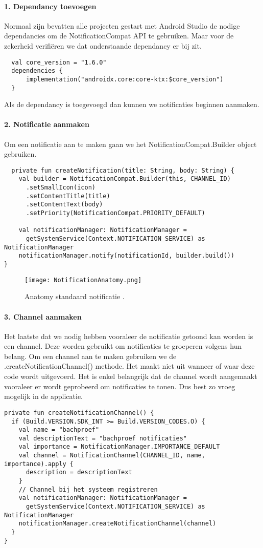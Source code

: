 \paragraph{1. Dependancy toevoegen}
Normaal zijn bevatten alle projecten gestart met Android Studio de nodige dependancies om de NotificationCompat API
te gebruiken. Maar voor de zekerheid verifiëren we dat onderstaande dependancy er bij zit.
\begin{verbatim}
  val core_version = "1.6.0"
  dependencies {
      implementation("androidx.core:core-ktx:$core_version")
  }
\end{verbatim}
Als de dependancy is toegevoegd dan kunnen we notificaties beginnen aanmaken.

\paragraph{2. Notificatie aanmaken}
Om een notificatie aan te maken gaan we het NotificationCompat.Builder object gebruiken. 
\begin{verbatim}
  private fun createNotification(title: String, body: String) {
    val builder = NotificationCompat.Builder(this, CHANNEL_ID)
      .setSmallIcon(icon)
      .setContentTitle(title)
      .setContentText(body)
      .setPriority(NotificationCompat.PRIORITY_DEFAULT)

    val notificationManager: NotificationManager =
      getSystemService(Context.NOTIFICATION_SERVICE) as NotificationManager
    notificationManager.notify(notificationId, builder.build())
}
\end{verbatim}
\begin{figure}[H]
    \centering
    \texttt{[image: NotificationAnatomy.png]}
    \caption{Anatomy standaard notificatie \parencite{One2020}.}
\end{figure}

\paragraph{3. Channel aanmaken}
Het laatste dat we nodig hebben vooraleer de notificatie getoond kan worden is een channel. Deze worden 
gebruikt om notificaties te groeperen volgens hun belang. Om een channel aan te maken gebruiken we 
de .createNotificationChannel() methode. Het maakt niet uit wanneer of waar deze code wordt uitgevoerd. 
Het is enkel belangrijk dat de channel wordt aangemaakt vooraleer er wordt geprobeerd om notificaties 
te tonen. Dus best zo vroeg mogelijk in de applicatie.
\begin{verbatim}
private fun createNotificationChannel() {
  if (Build.VERSION.SDK_INT >= Build.VERSION_CODES.O) {
    val name = "bachproef"
    val descriptionText = "bachproef notificaties"
    val importance = NotificationManager.IMPORTANCE_DEFAULT
    val channel = NotificationChannel(CHANNEL_ID, name, importance).apply {
      description = descriptionText
    }
    // Channel bij het systeem registreren
    val notificationManager: NotificationManager =
      getSystemService(Context.NOTIFICATION_SERVICE) as NotificationManager
    notificationManager.createNotificationChannel(channel)
  }
}
\end{verbatim}


